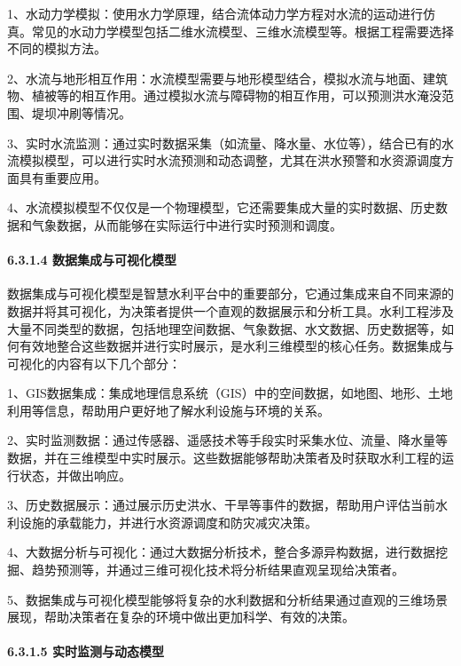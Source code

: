 1、水动力学模拟：使用水力学原理，结合流体动力学方程对水流的运动进行仿真。常见的水动力学模型包括二维水流模型、三维水流模型等。根据工程需要选择不同的模拟方法。

2、水流与地形相互作用：水流模型需要与地形模型结合，模拟水流与地面、建筑物、植被等的相互作用。通过模拟水流与障碍物的相互作用，可以预测洪水淹没范围、堤坝冲刷等情况。

3、实时水流监测：通过实时数据采集（如流量、降水量、水位等），结合已有的水流模拟模型，可以进行实时水流预测和动态调整，尤其在洪水预警和水资源调度方面具有重要应用。

4、水流模拟模型不仅仅是一个物理模型，它还需要集成大量的实时数据、历史数据和气象数据，从而能够在实际运行中进行实时预测和调度。

\paragraph{6.3.1.4 数据集成与可视化模型}\label{ux6570ux636eux96c6ux6210ux4e0eux53efux89c6ux5316ux6a21ux578b}

数据集成与可视化模型是智慧水利平台中的重要部分，它通过集成来自不同来源的数据并将其可视化，为决策者提供一个直观的数据展示和分析工具。水利工程涉及大量不同类型的数据，包括地理空间数据、气象数据、水文数据、历史数据等，如何有效地整合这些数据并进行实时展示，是水利三维模型的核心任务。数据集成与可视化的内容有以下几个部分：

1、GIS数据集成：集成地理信息系统（GIS）中的空间数据，如地图、地形、土地利用等信息，帮助用户更好地了解水利设施与环境的关系。

2、实时监测数据：通过传感器、遥感技术等手段实时采集水位、流量、降水量等数据，并在三维模型中实时展示。这些数据能够帮助决策者及时获取水利工程的运行状态，并做出响应。

3、历史数据展示：通过展示历史洪水、干旱等事件的数据，帮助用户评估当前水利设施的承载能力，并进行水资源调度和防灾减灾决策。

4、大数据分析与可视化：通过大数据分析技术，整合多源异构数据，进行数据挖掘、趋势预测等，并通过三维可视化技术将分析结果直观呈现给决策者。

5、数据集成与可视化模型能够将复杂的水利数据和分析结果通过直观的三维场景展现，帮助决策者在复杂的环境中做出更加科学、有效的决策。

\paragraph{6.3.1.5 实时监测与动态模型}\label{ux5b9eux65f6ux76d1ux6d4bux4e0eux52a8ux6001ux6a21ux578b}

